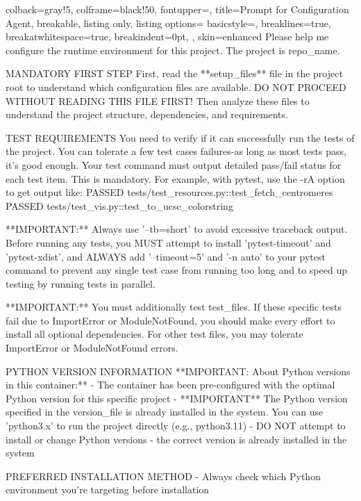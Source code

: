 \newpage
\begin{tcblisting}{
  colback=gray!5,
  colframe=black!50,
  fontupper=\ttfamily,
  title=Prompt for Configuration Agent,
  breakable,
  listing only,
  listing options={
    basicstyle=\ttfamily\small,
    breaklines=true,
    breakatwhitespace=true,
    breakindent=0pt,
  },
  skin=enhanced
}
Please help me configure the runtime environment for this project.
The project is {repo_name}.

MANDATORY FIRST STEP
First, read the **{setup_files}** file in the project root to understand which configuration files are available.
DO NOT PROCEED WITHOUT READING THIS FILE FIRST!
Then analyze these files to understand the project structure, dependencies, and requirements.

TEST REQUIREMENTS
You need to verify if it can successfully run the tests of the project.
You can tolerate a few test cases failures-as long as most tests pass, it's good enough.
Your test command must output detailed pass/fail status for each test item. This is mandatory. For example, with pytest, use the -rA option to get output like:
PASSED tests/test_resources.py::test_fetch_centromeres
PASSED tests/test_vis.py::test_to_ucsc_colorstring

**IMPORTANT:** Always use '--tb=short' to avoid excessive traceback output. Before running any tests, you MUST attempt to install 'pytest-timeout' and 'pytest-xdist', and ALWAYS add '--timeout=5' and '-n auto' to your pytest command to prevent any single test case from running too long and to speed up testing by running tests in parallel.

**IMPORTANT:** You must additionally test {test_files}. If these specific tests fail due to ImportError or ModuleNotFound, you should make every effort to install all optional dependencies. For other test files, you may tolerate ImportError or ModuleNotFound errors.

PYTHON VERSION INFORMATION
**IMPORTANT: About Python versions in this container:**
- The container has been pre-configured with the optimal Python version for this specific project 
- **IMPORTANT** The Python version specified in the {version_file} is already installed in the system. You can use 'python3.x' to run the project directly (e.g., python3.11)
- DO NOT attempt to install or change Python versions - the correct version is already installed in the system

PREFERRED INSTALLATION METHOD
- Always check which Python environment you're targeting before installation


\end{tcblisting}
